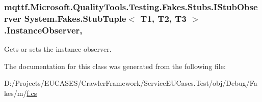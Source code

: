 \hypertarget{class_system_1_1_fakes_1_1_stub_tuple_3_01_t1_00_01_t2_00_01_t3_01_4_a472be4b9a204c8b49b50ad9d99797bc8}{
\subsubsection[{Instance\-Observer}]{\setlength{\rightskip}{0pt plus 5cm}mqttf.\-Microsoft.\-Quality\-Tools.\-Testing.\-Fakes.\-Stubs.\-I\-Stub\-Observer System.\-Fakes.\-Stub\-Tuple$<$ T1, T2, T3 $>$.Instance\-Observer\hspace{0.3cm}{\ttfamily [get]}, {\ttfamily [set]}}}\label{class_system_1_1_fakes_1_1_stub_tuple_3_01_t1_00_01_t2_00_01_t3_01_4_a472be4b9a204c8b49b50ad9d99797bc8}


Gets or sets the instance observer.



The documentation for this class was generated from the following file\-:\begin{DoxyCompactItemize}
\item 
D\-:/\-Projects/\-E\-U\-C\-A\-S\-E\-S/\-Crawler\-Framework/\-Service\-E\-U\-Cases.\-Test/obj/\-Debug/\-Fakes/m/\hyperlink{m_2f_8cs}{f.\-cs}\end{DoxyCompactItemize}
